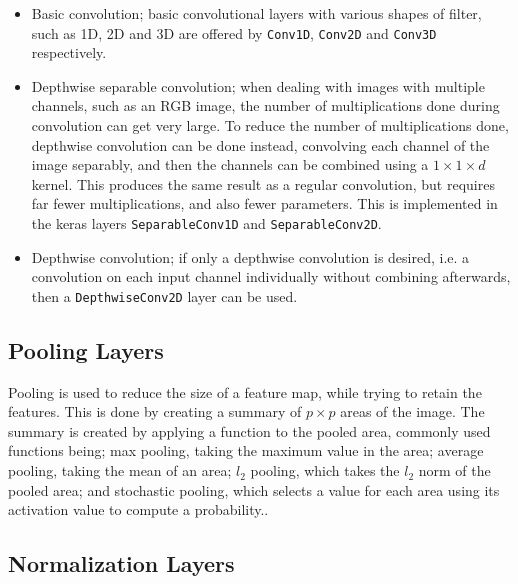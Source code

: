 \documentclass[12pt,a4paper,titlepage,twoside]{report}
\begin{document}
	\begin{itemize}
	\item Basic convolution; basic convolutional layers with various shapes of filter, such as 1D, 2D and 3D are offered by \texttt{Conv1D}, \texttt{Conv2D} and \texttt{Conv3D} respectively.
	\item Depthwise separable convolution; when dealing with images with multiple channels, such as an RGB image, the number of multiplications done during convolution can get very large. To reduce the number of multiplications done, depthwise convolution can be done instead, convolving each channel of the image separably, and then the channels can be combined using a $1 \times 1 \times d$ kernel. This produces the same result as a regular convolution, but requires far fewer multiplications, and also fewer parameters\cite{cnn-depth-conv}. This is implemented in the keras layers \texttt{SeparableConv1D} and \texttt{SeparableConv2D}.
	\item Depthwise convolution; if only a depthwise convolution is desired, i.e. a convolution on each input channel individually without combining afterwards, then a \texttt{DepthwiseConv2D} layer can be used.
	\end{itemize}
	
	\subsection{Pooling Layers}
	Pooling is used to reduce the size of a feature map, while trying to retain the features. This is done by creating a summary of $p \times p$ areas of the image. The summary is created by applying a function to the pooled area, commonly used functions being; max pooling, taking the maximum value in the area; average pooling, taking the mean of an area; $l_2$ pooling, which takes the $l_2$ norm of the pooled area; and stochastic pooling, which selects a value for each area using its activation value to compute a probability.\cite{cnn-analysis}.
	
	\subsection{Normalization Layers}
	
\end{document}
